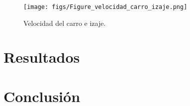 \documentclass{article}
\begin{document}
            \begin{figure}[H]
                \centering
                \texttt{[image: figs/Figure\_velocidad\_carro\_izaje.png]}
                \caption{Velocidad del carro e izaje.}
                \label{fig:velocidad_carro_izaje}
            \end{figure}




\section{Resultados}\label{sec:results}

\section{Conclusión}\label{sec:conclusion}


%

%
\end{document}
